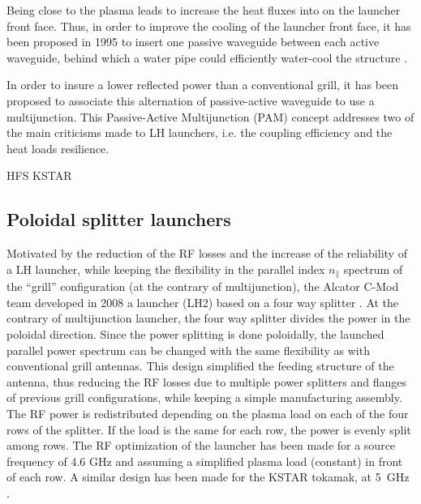 Being close to the plasma leads to increase the heat fluxes into on the launcher front face. Thus, in order to improve the cooling of the launcher front face, it has been proposed in 1995 to insert one passive waveguide between each active waveguide, behind which a water pipe could efficiently water-cool the structure . 

In order to insure a lower reflected power than a conventional grill, it has been proposed to associate this alternation of passive-active waveguide to  use a multijunction. This Passive-Active Multijunction (PAM) concept addresses two of the main criticisms made to LH launchers, i.e. the coupling efficiency and the heat loads resilience. 



HFS KSTAR


%
%
%

\subsection{Poloidal splitter launchers}
Motivated by the reduction of the RF losses and the increase of the reliability of a LH launcher, while keeping the flexibility in the parallel index $n_{\parallel}$ spectrum of the “grill” configuration (at the contrary of multijunction), the Alcator C-Mod team developed in 2008 a launcher (LH2) based on a four way splitter . At the contrary of multijunction launcher, the four way splitter divides the power in the poloidal direction. Since the power splitting is done poloidally, the launched parallel power spectrum can be changed with the same flexibility as with conventional grill antennas. This design simplified the feeding structure of the antenna, thus reducing the RF losses due to multiple power splitters and flanges of previous grill configurations, while keeping a simple manufacturing assembly. The RF power is redistributed depending on the plasma load on each of the four rows of the splitter. If the load is the same for each row, the power is evenly split among rows. The RF optimization of the launcher has been made for a source frequency of 4.6 GHz and assuming a simplified plasma load (constant) in front of each row. A similar design has been made for the KSTAR tokamak, at 5~GHz . 


